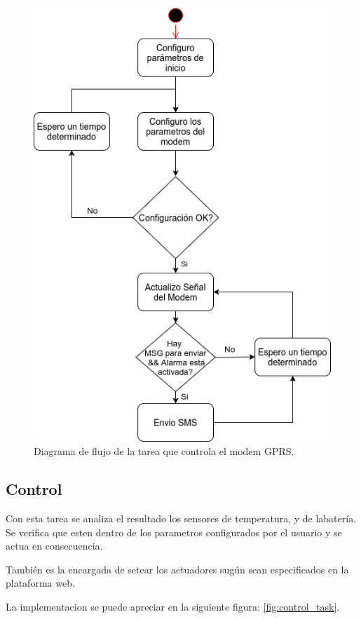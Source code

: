 \begin{itemize}
\begin{figure}[!htb]
  \centering
  \includegraphics[scale=.5]{./Figures/modem_task.png}
  \caption{Diagrama de flujo de la tarea que controla el modem GPRS.}
  \label{fig:modem_task}
\end{figure}


\subsection*{Control}
Con esta tarea se analiza el resultado los sensores de temperatura, y de labatería. Se verifica que esten dentro de los parametros configurados por el usuario y se actua en consecuencia.

También es la encargada de setear los actuadores sugún sean especificados en la plataforma web.

La implementacion se puede apreciar en la siguiente figura: \ref{fig:control_task}.


\end{itemize}
